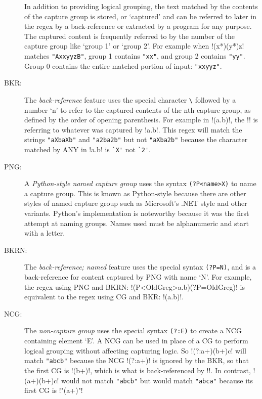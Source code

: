 \begin{description}
In addition to providing logical grouping, the text matched by the contents of the capture group is stored, or `captured' and can be referred to later in the regex by a back-reference or extracted by a program for any purpose.  The captured content is frequently referred to by the number of the capture group like `group 1' or `group 2'.  For example when \cverb!(x*)(y*)z! matches \verb!"AxxyyzB"!, group 1 contains \verb!"xx"!, and group 2 contains  \verb!"yy"!.  Group 0 contains the entire matched portion of input: \verb!"xxyyz"!.
\item[BKR:] The \emph{back-reference} feature uses the special character \verb!\! followed by a number `n' to refer to the captured contents of the nth capture group, as defined by the order of opening parenthesis.  For example in \cverb!(a.b)\1!, the \cverb!\1! is referring to whatever was captured by \cverb!a.b!.  This regex will match the strings \verb!"aXbaXb"! and \verb!"a2ba2b"! but not \verb!"aXba2b"! because the character matched by ANY in \cverb!a.b! is \verb!`X'! not \verb!`2'!.
\item[PNG:] A \emph{Python-style named capture group} uses the syntax \verb!(?P<name>X)! to name a capture group.  This is known as Python-style because there are other styles of named capture group such as Microsoft's .NET style and other variants.  Python's implementation is noteworthy because it was the first attempt at naming groups.  Names used must be alphanumeric and start with a letter.
\item[BKRN:] The \emph{back-reference; named} feature uses the special syntax \verb!(?P=N)!, and is a back-reference for content captured by PNG with name `N'.  For example, the regex using PNG and BKRN: \cverb!(P<OldGreg>a.b)(?P=OldGreg)! is equivalent to the regex using CG and BKR: \cverb!(a.b)\1!.
\item[NCG:] The \emph{non-capture group} uses the special syntax \verb!(?:E)! to create a NCG containing element `E'.  A NCG can be used in place of a CG to perform logical grouping without affecting capturing logic.  So \cverb!(?:a+)(b+)c\1! will match \verb!"abcb"! because the NCG \cverb!(?:a+)! is ignored by the BKR, so that the first CG is \cverb!(b+)!, which is what is back-referenced by \cverb!\1!.  In contrast, \cverb!(a+)(b+)c\1! would not match \verb!"abcb"! but would match \verb!"abca"! because its first CG is \cverb!"(a+)"!
\end{description}

